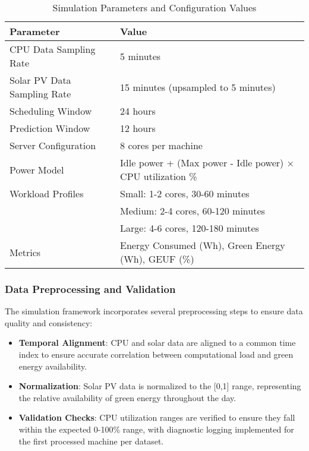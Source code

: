 \begin{table}[h]
\centering
\caption{Simulation Parameters and Configuration Values}
\label{tab:simulation_parameters}
\begin{tabular}{|l|p{6cm}|}
\hline
\textbf{Parameter} & \textbf{Value} \\
\hline
CPU Data Sampling Rate & 5 minutes \\
\hline
Solar PV Data Sampling Rate & 15 minutes (upsampled to 5 minutes) \\
\hline
Scheduling Window & 24 hours \\
\hline
Prediction Window & 12 hours \\
\hline
Server Configuration & 8 cores per machine \\
\hline
Power Model & Idle power + (Max power - Idle power) × CPU utilization \% \\
\hline
Workload Profiles & Small: 1-2 cores, 30-60 minutes\\
& Medium: 2-4 cores, 60-120 minutes\\
& Large: 4-6 cores, 120-180 minutes\\
\hline
Metrics & Energy Consumed (Wh), Green Energy (Wh), GEUF (\%) \\
\hline
\end{tabular}
\end{table}

\subsubsection{Data Preprocessing and Validation}
The simulation framework incorporates several preprocessing steps to ensure data quality and consistency:

\begin{itemize}
    \item \textbf{Temporal Alignment}: CPU and solar data are aligned to a common time index to ensure accurate correlation between computational load and green energy availability.
    
    \item \textbf{Normalization}: Solar PV data is normalized to the [0,1] range, representing the relative availability of green energy throughout the day.
    
    \item \textbf{Validation Checks}: CPU utilization ranges are verified to ensure they fall within the expected 0-100\% range, with diagnostic logging implemented for the first processed machine per dataset.
\end{itemize}


